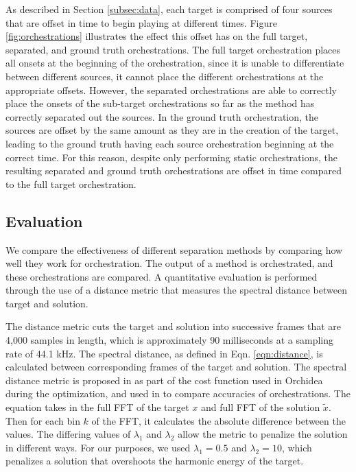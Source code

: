 \documentclass{article}
\begin{document}
		As described in Section \ref{subsec:data}, each target is comprised of four sources that are offset in time to begin playing at different times. Figure \ref{fig:orchestrations} illustrates the effect this offset has on the full target, separated, and ground truth orchestrations. The full target orchestration places all onsets at the beginning of the orchestration, since it is unable to differentiate between different sources, it cannot place the different orchestrations at the appropriate offsets. However, the separated orchestrations are able to correctly place the onsets of the sub-target orchestrations so far as the method has correctly separated out the sources. In the ground truth orchestration, the sources are offset by the same amount as they are in the creation of the target, leading to the ground truth having each source orchestration beginning at the correct time. For this reason, despite only performing static orchestrations, the resulting separated and ground truth orchestrations are offset in time compared to the full target orchestration.
		
		\subsection{Evaluation}
		We compare the effectiveness of different separation methods by comparing how well they work for orchestration. The output of a method is orchestrated, and these orchestrations are compared. A quantitative evaluation is performed through the use of a distance metric that measures the spectral distance between target and solution. 
		
		The distance metric cuts the target and solution into successive frames that are 4,000 samples in length, which is approximately 90 milliseconds at a sampling rate of 44.1 kHz. The spectral distance, as defined in Eqn. \ref{eqn:distance}, is calculated between corresponding frames of the target and solution. The spectral distance metric is proposed in \cite{Cella2020} as part of the cost function used in Orchidea during the optimization, and used in \cite{Cella2020b} to compare accuracies of orchestrations. The equation takes in the full FFT of the target $x$ and full FFT of the solution $\tilde{x}$. Then for each bin $k$ of the FFT, it calculates the absolute difference between the values. The differing values of $\lambda_1$ and $\lambda_2$ allow the metric to penalize the solution in different ways. For our purposes, we used $\lambda_1 = 0.5$ and $\lambda_2 = 10$, which penalizes a solution that overshoots the harmonic energy of the target.
		
\end{document}
